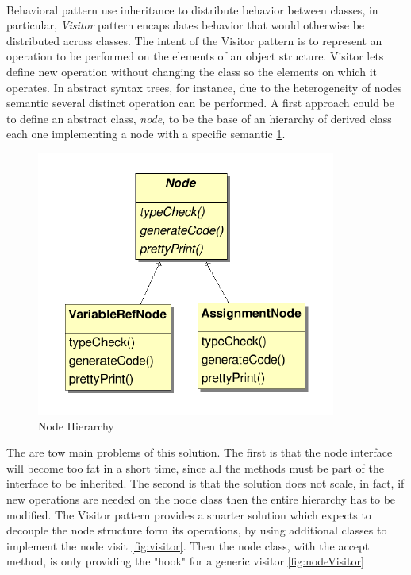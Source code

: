 \paragraph{} Behavioral pattern use inheritance to distribute behavior between classes, in particular, \textit{Visitor} pattern encapsulates behavior that would otherwise be distributed across classes. The intent of the Visitor pattern is to represent an operation to be performed on the elements of an object structure. Visitor lets define new operation without changing the class so the elements on which it operates. In abstract syntax trees, for instance, due to the heterogeneity of nodes semantic several distinct operation can be performed. A first approach could be to define an abstract class, \textit{node}, to be the base of an hierarchy of derived class each one implementing a node with a specific semantic \ref{fig:nodehierarchy}.
\begin{figure}[h]
\centering
\includegraphics[width=.4\textwidth]{Figs/nodesimple.PNG}
\caption{Node Hierarchy}
\label{fig:nodehierarchy}
\end{figure}
The are tow main problems of this solution. The first is that the node interface will become too fat in a short time, since all the methods must be part of the interface to be inherited. The second is that the solution does not scale, in fact, if new operations are needed on the node class then the entire hierarchy has to be modified. The Visitor pattern provides a smarter solution which expects to decouple the node structure form its operations, by using additional classes to implement the node visit \ref{fig:visitor}. Then the node class, with the accept method, is only providing the "hook" for a generic visitor \ref{fig:nodeVisitor}
